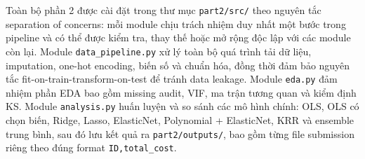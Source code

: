 Toàn bộ phần 2 được cài đặt trong thư mục \texttt{part2/src/} theo nguyên tắc separation of concerns: mỗi module chịu trách nhiệm duy nhất một bước trong pipeline và có thể được kiểm tra, thay thế hoặc mở rộng độc lập với các module còn lại. Module \texttt{data\_pipeline.py} xử lý toàn bộ quá trình tải dữ liệu, imputation, one-hot encoding,  biến số và chuẩn hóa, đồng thời đảm bảo nguyên tắc fit-on-train-transform-on-test để tránh data leakage. Module \texttt{eda.py} đảm nhiệm phần EDA bao gồm missing audit, VIF, ma trận tương quan và kiểm định KS. Module \texttt{analysis.py} huấn luyện và so sánh các mô hình chính: OLS, OLS có chọn biến, Ridge, Lasso, ElasticNet, Polynomial + ElasticNet, KRR và ensemble trung bình, sau đó lưu kết quả ra \texttt{part2/outputs/}, bao gồm từng file submission riêng theo đúng format \texttt{ID,total\_cost}.



